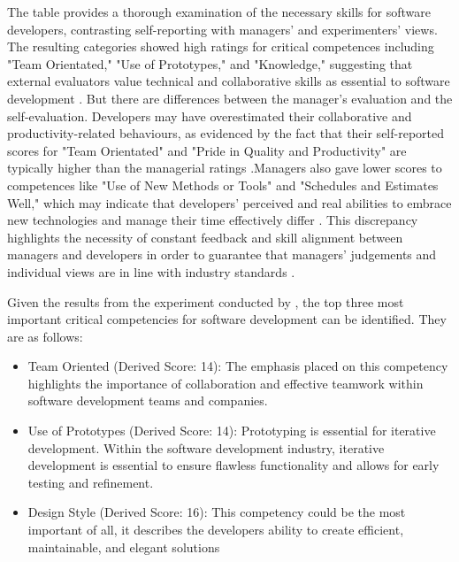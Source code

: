 \par{The table provides a thorough examination of the necessary skills for software developers, contrasting self-reporting with managers' and experimenters' views. The resulting categories showed high ratings for critical competences including "Team Orientated," "Use of Prototypes," and "Knowledge," suggesting that external evaluators value technical and collaborative skills as essential to software development \citep{mcconnell1996rapid}. But there are differences between the manager's evaluation and the self-evaluation. Developers may have overestimated their collaborative and productivity-related behaviours, as evidenced by the fact that their self-reported scores for "Team Orientated" and "Pride in Quality and Productivity" are typically higher than the managerial ratings .Managers also gave lower scores to competences like "Use of New Methods or Tools" and "Schedules and Estimates Well," which may indicate that developers' perceived and real abilities to embrace new technologies and manage their time effectively differ \citep{brooks1987essence}. This discrepancy highlights the necessity of constant feedback and skill alignment between managers and developers in order to guarantee that managers' judgements and individual views are in line with industry standards \citep{fagerholm2014role}.

Given the results from the experiment conducted by \cite{turley1994identifying}, the top three most important critical competencies for software development can be identified. They are as follows:
\begin{itemize}
    \item Team Oriented (Derived Score: 14): The emphasis placed on this competency highlights the importance of collaboration and effective teamwork within software development teams and companies.
    \item Use of Prototypes (Derived Score: 14): Prototyping is essential for iterative development. Within the software development industry, iterative development is essential to ensure flawless functionality and allows for early testing and refinement.
    \item Design Style (Derived Score: 16): This competency could be the most important of all, it describes the developers ability to create efficient, maintainable, and elegant solutions
\end{itemize}
}
    
